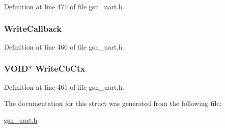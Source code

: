 Definition at line 471 of file gsn\_\-uart.h.

\hypertarget{a00263_aa2e51ff716434c03592f4fc183263a0f}{
\subsubsection[{WriteCallback}]{ {\bf WriteCallback}}}
\label{a00263_aa2e51ff716434c03592f4fc183263a0f}


Definition at line 460 of file gsn\_\-uart.h.

\hypertarget{a00263_aa649829459755e39af4893f8557347e5}{
\subsubsection[{WriteCbCtx}]{\setlength{\rightskip}{0pt plus 5cm}VOID$\ast$ {\bf WriteCbCtx}}}
\label{a00263_aa649829459755e39af4893f8557347e5}


Definition at line 461 of file gsn\_\-uart.h.



The documentation for this struct was generated from the following file:\begin{DoxyCompactItemize}
\item 
\hyperlink{a00600}{gsn\_\-uart.h}\end{DoxyCompactItemize}
